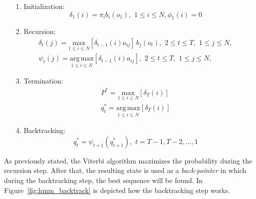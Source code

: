 \begin{itemize}
	\item[1.]{Initialization:} \\
	\begin{equation}
		\delta_{1}(i) = \pi_{i}b_{i}(o_{1}), \,\, 1 \leq i \leq N, \phi_{1}(i) = 0
	\end{equation}

	\item[2.]{Recursion:} \\
	\begin{subequations}
		\begin{align}
		\delta_{t}(j) = \underset{1\leq i \leq N}{\mathrm{max}} [\delta_{t-1}(i)a_{ij}] \, b_{j}(o_{t}), \,\, 2 \leq t \leq T, \,\, 1 \leq j \leq N, \\
		\psi_{t}(j) = \underset{1\leq i \leq N}{\mathrm{arg \, max}} [\delta_{t-1}(i)a_{ij}], \,\, 2 \leq t \leq T, \,\, 1 \leq j \leq N,
		\end{align}
	\end{subequations}

	\item[3.]{Termination:} \\
	\begin{subequations}
		\begin{align}
		P^{*} = \underset{1\leq i \leq N}{\mathrm{max}}[\delta_{T}(i)] \\
		q_{t}^{*} = \underset{1\leq i \leq N}{\mathrm{arg \, max}}[\delta_{T}(i)]
		\end{align}
	\end{subequations}

	\item[4.]{Backtracking:} \\
	\begin{equation}
		q_{t}^{*} = \psi_{t+1}(q_{t+1}^{*}), \,\, t = T - 1, T - 2, ... , 1
	\end{equation}
\end{itemize}

\noindent As previously stated, the Viterbi algorithm maximizes the probability during the recursion step. After that, the resulting state is used as a \textit{back-pointer} in which during the backtracking step, the best sequence will be found. In Figure~\ref{fig:hmm_backtrack} is depicted how the backtracking step works.

